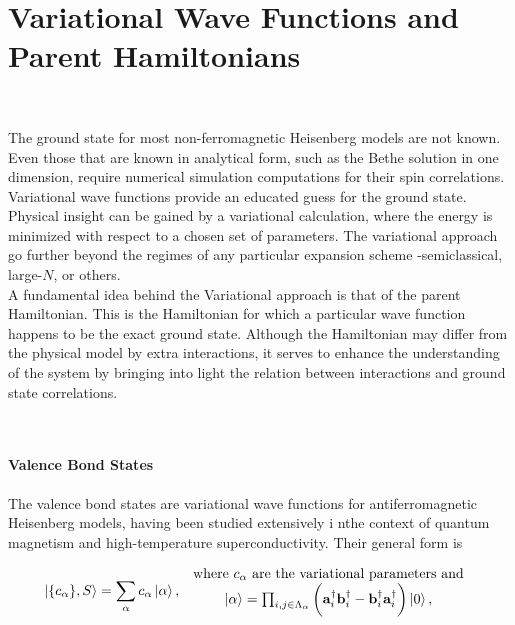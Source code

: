 
\section{\textbf{Variational Wave Functions and Parent Hamiltonians}}

\blanky \\

\begin{tcolorbox}[colback =yellow, title = Physical Context]

The ground state for most non-ferromagnetic Heisenberg models are not known. Even those that are known in analytical form, such as the Bethe solution in one dimension, require numerical simulation computations for their spin correlations. Variational wave functions provide an educated guess for the ground state. Physical insight can be gained by a variational calculation, where the energy is minimized with respect to a chosen set of parameters. The variational approach go further beyond the regimes of any particular expansion scheme -semiclassical, large-$N$, or others. \\

A fundamental idea behind the Variational approach is that of the parent Hamiltonian. This is the Hamiltonian for which a particular wave function happens to be the exact ground state. Although the Hamiltonian may differ from the physical model by extra interactions, it serves to enhance the understanding of the system by bringing into light the relation between interactions and ground state correlations. \\

\end{tcolorbox}

\blanky \\

\paragraph{\textbf{Valence Bond States}}

The valence bond states are variational wave functions for antiferromagnetic Heisenberg models, having been studied extensively i nthe context of quantum magnetism and high-temperature superconductivity. Their general form is 

\begin{equation}
    \ket{\{c_{\alpha}\}, S} = \sum_{\alpha} c_{\alpha} \ket{\alpha}, \begin{array}{c}
         \textnormal{ where $c_{\alpha}$ are the variational parameters and }  \\
         \ket{\alpha} = \prod_{i,j \in \Lambda_{\alpha}} \bigg({\bf a}_i^\dagger {\bf b}_i^\dagger - {\bf b}_i^\dagger {\bf a}_i^\dagger \bigg) \ket{0},
    \end{array}
    \label{Valence_bond_states}
\end{equation}

